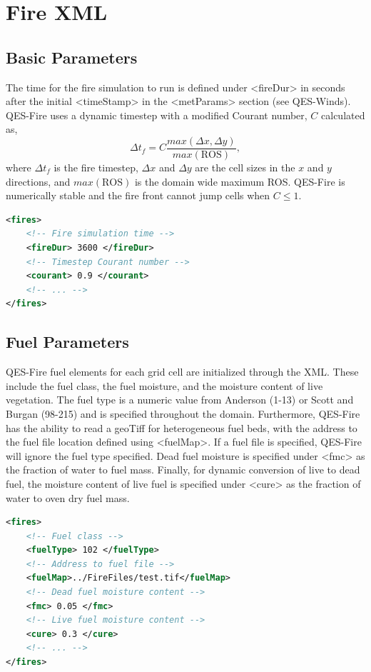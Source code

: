 \section{Fire XML}
\subsection{Basic Parameters}

The time for the fire simulation to run is defined under <fireDur> in seconds after the initial <timeStamp> in the <metParams> section (see QES-Winds). QES-Fire uses a dynamic timestep with a modified Courant number\cite{Ferziger2002}, $C$ calculated as,
\begin{equation}\label{eq:deltf}
    \Delta t_f = C \frac{max(\Delta x, \Delta y)}{max(\mathrm{ROS})},
\end{equation}
where $\Delta t_f$ is the fire timestep, $\Delta x$ and $\Delta y$ are the cell sizes in the $x$ and $y$ directions, and $max(\mathrm{ROS})$ is the domain wide maximum ROS. QES-Fire is numerically stable and the fire front cannot jump cells when $C\leq 1$. 
\begin{lstlisting}[language=XML]
<fires>
    <!-- Fire simulation time -->
    <fireDur> 3600 </fireDur>
    <!-- Timestep Courant number -->
    <courant> 0.9 </courant>
    <!-- ... -->
</fires>
\end{lstlisting}

\subsection{Fuel Parameters}

QES-Fire fuel elements for each grid cell are initialized through the XML. These include the fuel class, the fuel moisture, and the moisture content of live vegetation. The fuel type is a numeric value from Anderson (1-13) or Scott and Burgan (98-215) and is specified throughout the domain. Furthermore, QES-Fire has the ability to read a geoTiff for heterogeneous fuel beds, with the address to the fuel file location defined using <fuelMap>. If a fuel file is specified, QES-Fire will ignore the fuel type specified. Dead fuel moisture is specified under <fmc> as the fraction of water to fuel mass. Finally, for dynamic conversion of live to dead fuel, the moisture content of live fuel is specified under <cure> as the fraction of water to oven dry fuel mass.

\begin{lstlisting}[language=XML]
<fires>
    <!-- Fuel class -->
    <fuelType> 102 </fuelType>
    <!-- Address to fuel file -->
    <fuelMap>../FireFiles/test.tif</fuelMap>
    <!-- Dead fuel moisture content -->
    <fmc> 0.05 </fmc>
    <!-- Live fuel moisture content -->
    <cure> 0.3 </cure>
    <!-- ... -->
</fires>
\end{lstlisting}

